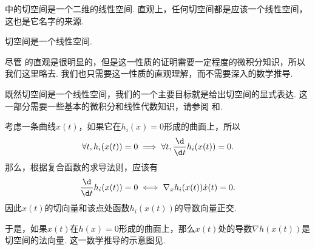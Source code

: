  中的切空间是一个二维的线性空间. 直观上，任何切空间都是应该一个线性空间，这也是它名字的来源. 
\begin{lemma}\label{lemma:tan-space}
    切空间是一个线性空间. 
\end{lemma}

尽管 的直观是很明显的，但是这一性质的证明需要一定程度的微积分知识，所以我们这里略去. 我们也只需要这一性质的直观理解，而不需要深入的数学推导.

既然切空间是一个线性空间，我们的一个主要目标就是给出切空间的显式表达. 这一部分需要一些基本的微积分和线性代数知识，请参阅 和.

考虑一条曲线$x(t)$，如果它在$h_i(x)=0$形成的曲面上，所以
\[\forall t,h_i(x(t))=0\implies\forall t, \frac{\d}{\d t}h_i(x(t))=0.\]
那么，根据复合函数的求导法则，应该有
\[\frac{\d}{\d t}h_i(x(t))=0\iff \nabla_x h_i(x(t))\dot{x}(t)=0.\]
因此$x(t)$的切向量和该点处函数$h_i(x(t))$的导数向量正交. 

于是，如果$x(t)$在$h(x)=0$形成的曲面上，那么$x(t)$处的导数$\nabla h(x(t))$是切空间的法向量. 这一数学推导的示意图见.

